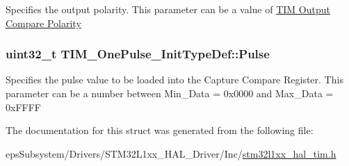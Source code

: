 Specifies the output polarity. This parameter can be a value of \hyperlink{group___t_i_m___output___compare___polarity}{T\-I\-M Output Compare Polarity} \hypertarget{struct_t_i_m___one_pulse___init_type_def_a4f1fbf6d60812c3194e9ee8a05f5cfa6}{
\subsubsection[{Pulse}]{\setlength{\rightskip}{0pt plus 5cm}uint32\-\_\-t T\-I\-M\-\_\-\-One\-Pulse\-\_\-\-Init\-Type\-Def\-::\-Pulse}}\label{struct_t_i_m___one_pulse___init_type_def_a4f1fbf6d60812c3194e9ee8a05f5cfa6}
Specifies the pulse value to be loaded into the Capture Compare Register. This parameter can be a number between Min\-\_\-\-Data = 0x0000 and Max\-\_\-\-Data = 0x\-F\-F\-F\-F 

The documentation for this struct was generated from the following file\-:\begin{DoxyCompactItemize}
\item 
eps\-Subsystem/\-Drivers/\-S\-T\-M32\-L1xx\-\_\-\-H\-A\-L\-\_\-\-Driver/\-Inc/\hyperlink{stm32l1xx__hal__tim_8h}{stm32l1xx\-\_\-hal\-\_\-tim.\-h}\end{DoxyCompactItemize}
